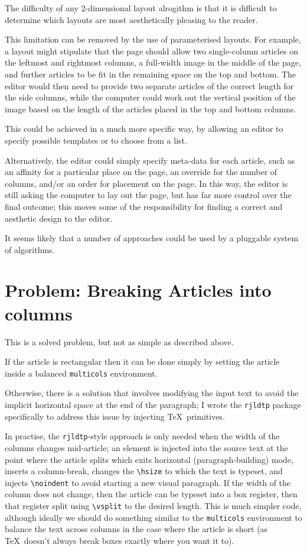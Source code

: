 \documentclass[a4paper]{scrartcl}
\begin{document}
The difficulty of any 2-dimensional layout alrogithm is that it is
difficult to determine which layouts are most aesthetically pleasing
to the reader.

This limitation can be removed by the use of parameterised layouts.
For example, a layout might stipulate that the page should allow two
single-column articles on the leftmost and rightmost columns, a
full-width image in the middle of the page, and further articles to be
fit in the remaining space on the top and bottom. The editor would
then need to provide two separate articles of the correct length for
the side columns, while the computer could work out the vertical
position of the image based on the length of the articles placed in
the top and bottom columns.

This could be achieved in a much more specific way, by allowing an
editor to specify possible templates or to choose from a list.

Alternatively, the editor could simply specify meta-data for each
article, such as an affinity for a particular place on the page, an
override for the number of columns, and/or an order for placement on
the page. In this way, the editor is still asking the computer to lay
out the page, but has far more control over the final outcome; this
moves some of the responsibility for finding a correct and aesthetic
design to the editor.


It seems likely that a number of approaches could be used by a
pluggable system of algorithms.

\section{Problem: Breaking Articles into columns}

This is a solved problem, but not as simple as described above.

If the article is rectangular then it can be done simply by setting
the article inside a balanced \verb!multicols! environment.

Otherwise, there is a solution that involves modifying the input text
to avoid the implicit horizontal space at the end of the paragraph; I
wrote the \verb!rjldtp! package specifically to address this issue by
injecting \TeX\ primitives.

In practise, the \verb!rjldtp!-style approach is only needed when the
width of the columns changes mid-article; an element is injected into
the source text at the point where the article splits which exits
horizontal (paragraph-building) mode, inserts a column-break,
changes the \verb!\hsize! to which the text is typeset, and injects
\verb!\noindent! to avoid starting a new visual paragraph. If the
width of the column does not change, then the article can be typeset
into a box register, then that register split using \verb!\vsplit! to
the desired length. This is much simpler code, although ideally we
should do something similar to the \verb!multicols! environment to
balance the text across columns in the case where the article is short
(as \TeX\ doesn't always break boxes exactly where you want it to).
\end{document}
